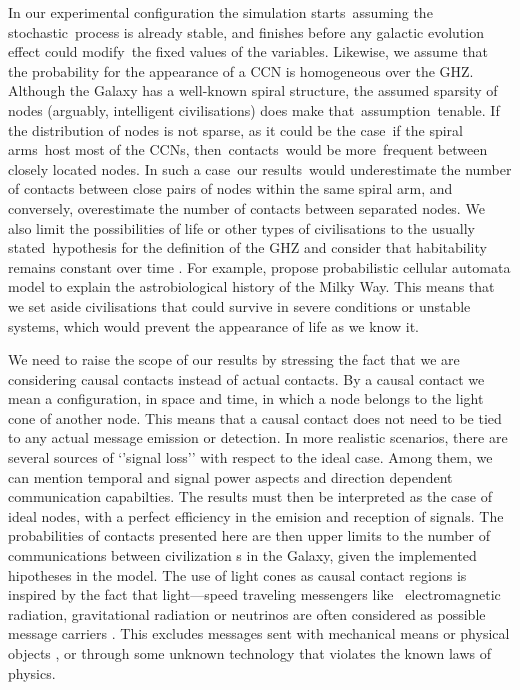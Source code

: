 \documentclass[crop]{CSLB}
\newcommand{\ceti}{CCN}
\newcommand{\cetis}{CCNs}
\begin{document}
In our experimental configuration the simulation starts assuming the stochastic process is already stable, and finishes before any galactic evolution effect could modify the fixed values of the variables.
%
Likewise, we assume that the probability for the appearance of a \ceti{} is homogeneous over the GHZ.
%
Although the Galaxy has a well-known spiral structure, the assumed sparsity of nodes (arguably, intelligent civilisations) does make that assumption tenable.
%
If the distribution of nodes is not sparse, as it could be the case if the spiral arms host most of the \cetis{}, then contacts would be more frequent between closely located nodes.
%
In such a case our results would underestimate the number of contacts between close pairs of nodes within the same spiral arm, and conversely, overestimate the number of contacts between separated nodes.
%
We also limit the possibilities of life or other types of civilisations to the usually stated hypothesis for the definition of
the GHZ \citep{dayal_habitability_2016, gonzalez_galactic_2001, lineweaver_galactic_2004, gonzalez_habitable_2005,
morrison_extending_2015, haqq-misra_evolution_2019, rahvar_cosmic_2016, gobat_evolution_2016, rahvar_cosmic_2016} and consider that habitability remains constant over time \citep[see, however, ][]{gonzalez_habitable_2005, dayal_habitability_2016, gobat_evolution_2016}.
%
For example, \citet{vukotic_astrobiological_2012} propose
probabilistic cellular automata model to explain the astrobiological
history of the Milky Way. %
%
This means that we set aside civilisations that could survive in severe conditions or unstable systems, which would prevent the appearance of life as we know it.  



We need to raise the scope of our results by stressing the fact that we are considering causal contacts instead of actual contacts.
%
By a causal contact we mean a configuration, in space and time, in which a node belongs to the light cone of another node.
%
This means that a causal contact does not need to be tied to any actual message emission or detection.
%
In more realistic scenarios, there are several sources of ‘’signal loss’’ with respect to the ideal case.
%
Among them, we can mention temporal and signal power aspects and direction dependent communication capabilties.
%
The results must then be interpreted as the case of ideal nodes, with a perfect efficiency in the emision and reception of signals.
%
The probabilities of contacts presented here are then upper limits to the number of communications between civilization s in the Galaxy, given the implemented hipotheses in the model.
%
The use of light cones as causal contact regions is inspired by the fact that light—speed traveling messengers like 
electromagnetic radiation, gravitational radiation or neutrinos are often considered as possible message carriers \citep{hippke_interstellar_2017, wright_how_2018}.
%
This excludes messages sent with mechanical means or physical objects \citep[e.g., ][]{Armstrong2013, barlow_galactic_2013}, or through some unknown technology that violates the known laws of physics.
\end{document}
